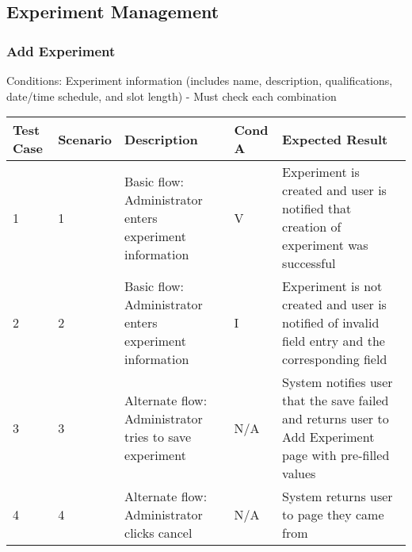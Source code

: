 \begin{landscape}
\clearpage
\subsection{Experiment Management}
\subsubsection{Add Experiment}
\begin{outline}[enumerate]
\1 [] Conditions:
\2 [A] Experiment information (includes name, description, qualifications, date/time schedule, and slot length) - Must check each combination
\end{outline}
\begin{table}[!h]
    \begin{tabular}{|l|l|p{3in}|l|p{3.25in}|}
        \hline
        Test Case & Scenario & Description & Cond A & Expected Result \\ \hline
        1 & 1 & Basic flow: Administrator enters experiment information & V & Experiment is created and user is notified that creation of experiment was successful \\ \hline
        2 & 2 & Basic flow: Administrator enters experiment information & I & Experiment is not created and user is notified of invalid field entry and the corresponding field \\ \hline
        3 & 3 & Alternate flow: Administrator tries to save experiment & N/A & System notifies user that the save failed and returns user to Add Experiment page with pre-filled values \\ \hline
        4 & 4 & Alternate flow: Administrator clicks cancel & N/A & System returns user to page they came from \\ \hline
    \end{tabular}
\end{table}


\end{landscape}

